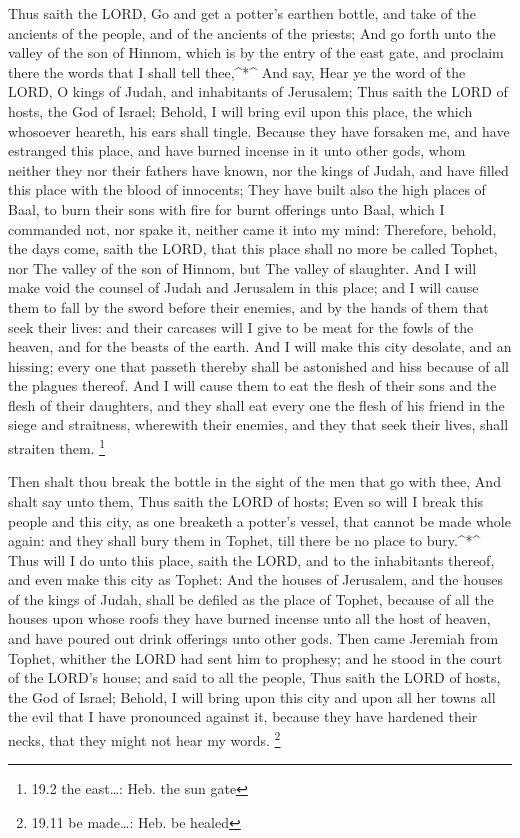  Thus saith the LORD, Go and get a potter's earthen bottle,
and take of the ancients of the people, and of the ancients of the
priests;  And go forth unto the valley of the son of Hinnom,
which is by the entry of the east gate, and proclaim there the words
that I shall tell thee,\^{}*\^{}  And say, Hear ye the word
of the LORD, O kings of Judah, and inhabitants of Jerusalem; Thus saith
the LORD of hosts, the God of Israel; Behold, I will bring evil upon
this place, the which whosoever heareth, his ears shall tingle.
 Because they have forsaken me, and have estranged this
place, and have burned incense in it unto other gods, whom neither they
nor their fathers have known, nor the kings of Judah, and have filled
this place with the blood of innocents;  They have built
also the high places of Baal, to burn their sons with fire for burnt
offerings unto Baal, which I commanded not, nor spake it, neither came
it into my mind:  Therefore, behold, the days come, saith
the LORD, that this place shall no more be called Tophet, nor The valley
of the son of Hinnom, but The valley of slaughter.  And I
will make void the counsel of Judah and Jerusalem in this place; and I
will cause them to fall by the sword before their enemies, and by the
hands of them that seek their lives: and their carcases will I give to
be meat for the fowls of the heaven, and for the beasts of the earth.
 And I will make this city desolate, and an hissing; every
one that passeth thereby shall be astonished and hiss because of all the
plagues thereof.  And I will cause them to eat the flesh of
their sons and the flesh of their daughters, and they shall eat every
one the flesh of his friend in the siege and straitness, wherewith their
enemies, and they that seek their lives, shall straiten them.
\footnote{19.2 the east\ldots: Heb. the sun gate}

 Then shalt thou break the bottle in the sight of the men
that go with thee,  And shalt say unto them, Thus saith the
LORD of hosts; Even so will I break this people and this city, as one
breaketh a potter's vessel, that cannot be made whole again: and they
shall bury them in Tophet, till there be no place to bury.\^{}*\^{}
 Thus will I do unto this place, saith the LORD, and to the
inhabitants thereof, and even make this city as Tophet: 
And the houses of Jerusalem, and the houses of the kings of Judah, shall
be defiled as the place of Tophet, because of all the houses upon whose
roofs they have burned incense unto all the host of heaven, and have
poured out drink offerings unto other gods.  Then came
Jeremiah from Tophet, whither the LORD had sent him to prophesy; and he
stood in the court of the LORD's house; and said to all the people,
 Thus saith the LORD of hosts, the God of Israel; Behold, I
will bring upon this city and upon all her towns all the evil that I
have pronounced against it, because they have hardened their necks, that
they might not hear my words. \footnote{19.11 be made\ldots: Heb. be
  healed}

